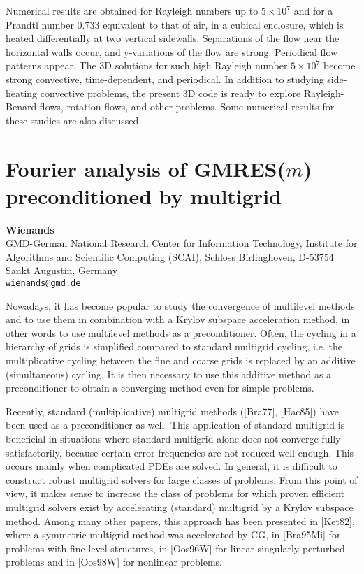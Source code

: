 \documentclass[11pt]{article}
\newcommand{\nextab}[4]{
	\section{#2}
	{\bf #1} \\ \nopagebreak
	{#3} \\ \nopagebreak
	{\tt #4} \nopagebreak
	}
\begin{document}
Numerical results are obtained for
Rayleigh numbers up to $5\times10^7$  and for a
Prandtl number 0.733 equivalent to that of air, in a
cubical enclosure, which is heated
differentially at two vertical sidewalls.
Separations of the flow near the horizontal walls occur,
and y-variations of the flow are strong. Periodical flow patterns appear.
The 3D solutions for such high Rayleigh number
$5\times10^7$ become strong
convective, time-dependent, and periodical. In addition to studying
side-heating convective problems, the present 3D code is ready to explore
Rayleigh-Benard flows, rotation flows, and other problems.
Some numerical results for these studies are also discussed.


\nextab{Wienands}
	{Fourier analysis of GMRES($m$) preconditioned by multigrid}
	{GMD-German National Research Center for Information Technology,
	Institute for Algorithms and Scientific Computing (SCAI),
	Schloss Birlinghoven, D-53754 Sankt Augustin, Germany}
	{wienands@gmd.de}

Nowadays, it has become popular to study the convergence of multilevel
methods and to use them in combination with a Krylov subspace acceleration
method, in other words to use multilevel methods as a preconditioner.
Often, the cycling in a hierarchy of grids is simplified compared to standard
multigrid cycling, i.e. the multiplicative cycling between the fine and
coarse grids is replaced by an additive (simultaneous) cycling. It is then
necessary to use this additive method as a preconditioner to obtain a
converging method even for simple problems.

Recently, standard (multiplicative)
multigrid methods ([Bra77], [Hac85]) have been used as a preconditioner as well.
This application of standard multigrid is beneficial in situations where
standard multigrid alone does not converge fully satisfactorily, because
certain error frequencies are not reduced well enough. This occurs mainly
when complicated PDEs are solved. In general, it is difficult to construct
robust multigrid solvers for large classes of problems. From this point of view,
it makes sense to increase the class of problems for which proven efficient
multigrid solvers exist by accelerating (standard) multigrid by a Krylov
subspace method. Among many other papers, this approach has been presented in
[Ket82], where  a symmetric multigrid method was accelerated by CG, in [Bra95Mi]
for problems  with fine level structures, in [Oos96W] for linear singularly
perturbed problems and in [Oos98W] for nonlinear problems.
\end{document}
